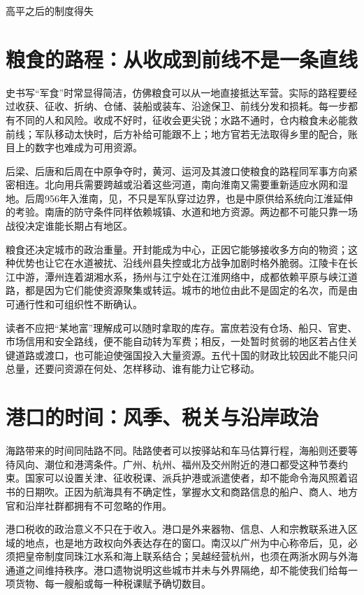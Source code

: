\begin{causalchain}{高平之后的制度得失}
\section{粮食的路程：从收成到前线不是一条直线}

史书写“军食”时常显得简洁，仿佛粮食可以从一地直接抵达军营。实际的路程要经过收获、征收、折纳、仓储、装船或装车、沿途保卫、前线分发和损耗。每一步都有不同的人和风险。收成不好时，征收会更尖锐；水路不通时，仓内粮食未必能救前线；军队移动太快时，后方补给可能跟不上；地方官若无法取得乡里的配合，账目上的数字也难成为可用资源。

后梁、后唐和后周在中原争夺时，黄河、运河及其渡口使粮食的路程同军事方向紧密相连。北向用兵需要跨越或沿着这些河道，南向淮南又需要重新适应水网和湿地。后周956年入淮南，见，不只是军队穿过边界，也是中原供给系统向江淮延伸的考验。南唐的防守条件同样依赖城镇、水道和地方资源。两边都不可能只靠一场战役决定谁能长期占有地区。

粮食还决定城市的政治重量。开封能成为中心，正因它能够接收多方向的物资；这种优势也让它在水道被扰、沿线州县失控或北方战争加剧时格外脆弱。江陵卡在长江中游，潭州连着湖湘水系，扬州与江宁处在江淮网络中，成都依赖平原与峡江道路，都是因为它们能使资源聚集或转运。城市的地位由此不是固定的名次，而是由可通行性和可组织性不断确认。

读者不应把“某地富”理解成可以随时拿取的库存。富庶若没有仓场、船只、官吏、市场信用和安全路线，便不能自动转为军费；相反，一处暂时贫弱的地区若占住关键道路或渡口，也可能迫使强国投入大量资源。五代十国的财政比较因此不能只问总量，还要问资源在何处、怎样移动、谁有能力让它移动。

\section{港口的时间：风季、税关与沿岸政治}

海路带来的时间同陆路不同。陆路使者可以按驿站和车马估算行程，海船则还要等待风向、潮位和港湾条件。广州、杭州、福州及交州附近的港口都受这种节奏约束。国家可以设置关津、征收税课、派兵护港或派遣使者，却不能命令海风照着诏书的日期吹。正因为航海具有不确定性，掌握水文和商路信息的船户、商人、地方官和沿岸社群都拥有不可忽略的作用。

港口税收的政治意义不只在于收入。港口是外来器物、信息、人和宗教联系进入区域的地点，也是地方政权向外表达存在的窗口。南汉以广州为中心称帝后，见，必须把皇帝制度同珠江水系和海上联系结合；吴越经营杭州，也须在两浙水网与外海通道之间维持秩序。港口遗物说明这些城市并未与外界隔绝，却不能使我们给每一项货物、每一艘船或每一种税课赋予确切数目。


\end{causalchain}

